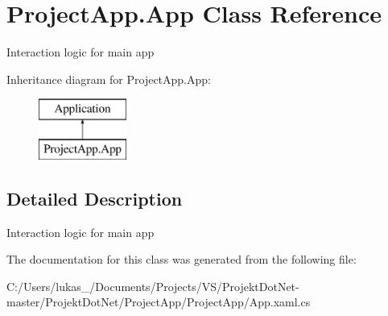 \hypertarget{class_project_app_1_1_app}{}\section{Project\+App.\+App Class Reference}
\label{class_project_app_1_1_app}


Interaction logic for main app  


Inheritance diagram for Project\+App.\+App\+:\begin{figure}[H]
\begin{center}
\leavevmode
\includegraphics[height=2.000000cm]{class_project_app_1_1_app}
\end{center}
\end{figure}


\subsection{Detailed Description}
Interaction logic for main app 



The documentation for this class was generated from the following file\+:\begin{DoxyCompactItemize}
\item 
C\+:/\+Users/lukas\+\_/\+Documents/\+Projects/\+V\+S/\+Projekt\+Dot\+Net-\/master/\+Projekt\+Dot\+Net/\+Project\+App/\+Project\+App/App.\+xaml.\+cs\end{DoxyCompactItemize}
